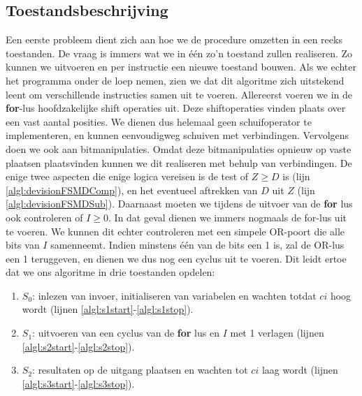 \subsection{Toestandsbeschrijving}
Een eerste probleem dient zich aan hoe we de procedure omzetten in een reeks toestanden. De vraag is immers wat we in \'e\'en zo'n toestand zullen realiseren. Zo kunnen we  uitvoeren en per instructie een nieuwe toestand bouwen. Als we echter het programma onder de loep nemen, zien we dat dit algoritme zich uitstekend leent om verschillende instructies samen uit te voeren. Allereerst voeren we in de \textbf{for}-lus hoofdzakelijke shift operaties uit. Deze shiftoperaties vinden plaats over een vast aantal posities. We dienen dus helemaal geen schuifoperator te implementeren, en kunnen eenvoudigweg schuiven met verbindingen. Vervolgens doen we ook aan bitmanipulaties. Omdat deze bitmanipulaties opnieuw op vaste plaatsen plaatsvinden kunnen we dit realiseren met behulp van verbindingen. De enige twee aspecten die enige logica vereisen is de test of $Z\geq D$ is (lijn \ref{algl:devisionFSMDComp}), en het eventueel aftrekken van $D$ uit $Z$ (lijn \ref{algl:devisionFSMDSub}). Daarnaast moeten we tijdens de uitvoer van de \textbf{for} lus ook controleren of $I\geq 0$. In dat geval dienen we immers nogmaals de for-lus uit te voeren. We kunnen dit echter controleren met een simpele OR-poort die alle bits van $I$ samenneemt. Indien minstens \'e\'en van de bits een 1 is, zal de OR-lus een 1 teruggeven, en dienen we dus nog een cyclus uit te voeren. Dit leidt ertoe dat we ons algoritme in drie toestanden opdelen:
\begin{enumerate}
 \item $S_0$: inlezen van invoer, initialiseren van variabelen en wachten totdat $ci$ hoog wordt (lijnen \ref{algl:s1start}-\ref{algl:s1stop}).
 \item $S_1$: uitvoeren van een cyclus van de \textbf{for} lus en $I$ met 1 verlagen (lijnen \ref{algl:s2start}-\ref{algl:s2stop}).
 \item $S_2$: resultaten op de uitgang plaatsen en wachten tot $ci$ laag wordt (lijnen \ref{algl:s3start}-\ref{algl:s3stop}).
\end{enumerate}
